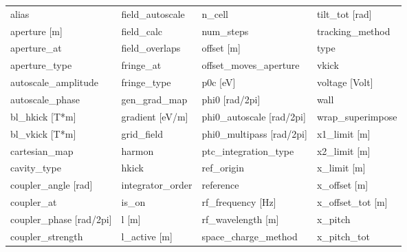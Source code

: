  \begin{tabular}{llll} \toprule
alias                            & field_autoscale                  & n_cell                           & tilt_tot [rad]                   \\
aperture [m]                     & field_calc                       & num_steps                        & tracking_method                  \\
aperture_at                      & field_overlaps                   & offset [m]                       & type                             \\
aperture_type                    & fringe_at                        & offset_moves_aperture            & vkick                            \\
autoscale_amplitude              & fringe_type                      & p0c [eV]                         & voltage [Volt]                   \\
autoscale_phase                  & gen_grad_map                     & phi0 [rad/2pi]                   & wall                             \\
bl_hkick [T*m]                   & gradient [eV/m]                  & phi0_autoscale [rad/2pi]         & wrap_superimpose                 \\
bl_vkick [T*m]                   & grid_field                       & phi0_multipass [rad/2pi]         & x1_limit [m]                     \\
cartesian_map                    & harmon                           & ptc_integration_type             & x2_limit [m]                     \\
cavity_type                      & hkick                            & ref_origin                       & x_limit [m]                      \\
coupler_angle [rad]              & integrator_order                 & reference                        & x_offset [m]                     \\
coupler_at                       & is_on                            & rf_frequency [Hz]                & x_offset_tot [m]                 \\
coupler_phase [rad/2pi]          & l [m]                            & rf_wavelength [m]                & x_pitch                          \\
coupler_strength                 & l_active [m]                     & space_charge_method              & x_pitch_tot                      \\

\end{tabular}
